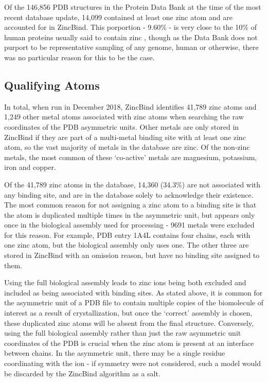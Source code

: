 Of the 146,856 PDB structures in the Protein Data Bank at the time of the most recent database update, 14,099 contained at least one zinc atom and are accounted for in ZincBind. This porportion - 9.60\% - is very close to the 10\% of human proteins usually said to contain zinc , though as the Data Bank does not purport to be representative sampling of any genome, human or otherwise, there was no particular reason for this to be the case.

\subsection{Qualifying Atoms}

In total, when run in December 2018, ZincBind identifies 41,789 zinc atoms and 1,249 other metal atoms associated with zinc atoms when searching the raw coordinates of the PDB asymmetric units. Other metals are only stored in ZincBind if they are part of a multi-metal binding site with at least one zinc atom, so the vast majority of metals in the database are zinc. Of the non-zinc metals, the most common of these `co-active' metals are magnesium, potassium, iron and copper.

Of the 41,789 zinc atoms in the database, 14,360 (34.3\%) are not associated with any binding site, and are in the database solely to acknowledge their existence. The most common reason for not assigning a zinc atom to a binding site is that the atom is duplicated multiple times in the asymmetric unit, but appears only once in the biological assembly used for processing - 9691 metals were excluded for this reason. For example, PDB entry 1A4L contains four chains, each with one zinc atom, but the biological assembly only uses one. The other three are stored in ZincBind with an omission reason, but have no binding site assigned to them.

Using the full biological assembly leads to zinc ions being both excluded and included as being associated with binding sites. As stated above, it is common for the asymmetric unit of a PDB file to contain multiple copies of the biomolecule of interest as a result of crystallization, but once the `correct' assembly is chosen, these duplicated zinc atoms will be absent from the final structure. Conversely, using the full biological assembly rather than just the raw asymmetric unit coordinates of the PDB is crucial when the zinc atom is present at an interface between chains. In the asymmetric unit, there may be a single residue coordinating with the ion - if symmetry were not considered, such a model would be discarded by the ZincBind algorithm as a salt.

